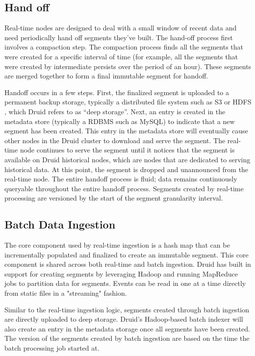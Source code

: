 \documentclass{vldb}
\begin{document}
\subsection{Hand off}
Real-time nodes are designed to deal with a small window of recent data and
need periodically hand off segments they’ve built. The hand-off process first
involves a compaction step. The compaction process finds all the segments that
were created for a specific interval of time (for example, all the segments
that were created by intermediate persists over the period of an hour). These
segments are merged together to form a final immutable segment for handoff. 

Handoff occurs in a few steps. First, the finalized segment is uploaded to a
permanent backup storage, typically a distributed file system such as S3
\cite{decandia2007dynamo} or HDFS \cite{shvachko2010hadoop}, which Druid refers
to as “deep storage”. Next, an entry is created in the metadata store
(typically a RDBMS such as MySQL) to indicate that a new segment has been
created. This entry in the metadata store will eventually cause other nodes in
the Druid cluster to download and serve the segment. The real-time node
continues to serve the segment until it notices that the segment is available
on Druid historical nodes, which are nodes that are dedicated to serving
historical data. At this point, the segment is dropped and unannounced from the
real-time node. The entire handoff process is fluid; data remains continuously
queryable throughout the entire handoff process. Segments created by real-time
processing are versioned by the start of the segment granularity interval.

\subsection{Batch Data Ingestion}
The core component used by real-time ingestion is a hash map that can be
incrementally populated and finalized to create an immutable segment. This core
component is shared across both real-time and batch ingestion. Druid has built
in support for creating segments by leveraging Hadoop and running MapReduce
jobs to partition data for segments.  Events can be read in one at a time
directly from static files in a "streaming" fashion.

Similar to the real-time ingestion logic, segments created through batch
ingestion are directly uploaded to deep storage. Druid’s Hadoop-based batch
indexer will also create an entry in the metadata storage once all segments
have been created. The version of the segments created by batch ingestion are
based on the time the batch processing job started at.
\end{document}
